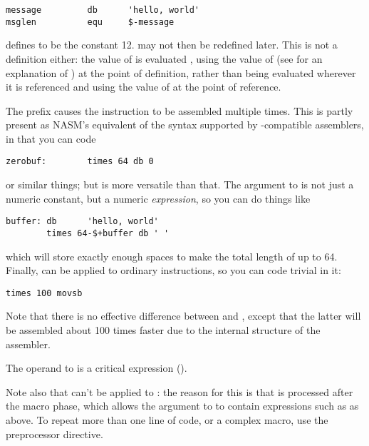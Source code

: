 \begin{lstlisting}
message         db      'hello, world'
msglen          equ     $-message
\end{lstlisting}

defines  to be the constant 12.  may
not then be redefined later. This is not a 
definition either: the value of  is evaluated ,
using the value of \code{\$} (see  for an explanation
of \code{\$}) at the point of definition, rather than being evaluated
wherever it is referenced and using the value of \code{\$} at
the point of reference.


The  prefix causes the instruction to be assembled multiple
times. This is partly present as NASM's equivalent of the 
syntax supported by -compatible assemblers, in that you can
code

\begin{lstlisting}
zerobuf:        times 64 db 0
\end{lstlisting}

or similar things; but  is more versatile than that. The
argument to  is not just a numeric constant, but a numeric
\emph{expression}, so you can do things like

\begin{lstlisting}
buffer: db      'hello, world'
        times 64-$+buffer db ' '
\end{lstlisting}

which will store exactly enough spaces to make the total length of
 up to 64. Finally,  can be applied to ordinary
instructions, so you can code trivial  in it:

\begin{lstlisting}
times 100 movsb
\end{lstlisting}

Note that there is no effective difference between  and , except that the latter will be assembled about
100 times faster due to the internal structure of the assembler.

The operand to  is a critical expression ().

Note also that  can't be applied to : the reason
for this is that  is processed after the macro phase, which
allows the argument to  to contain expressions such as
 as above. To repeat more than one line of code,
or a complex macro, use the preprocessor  directive.

